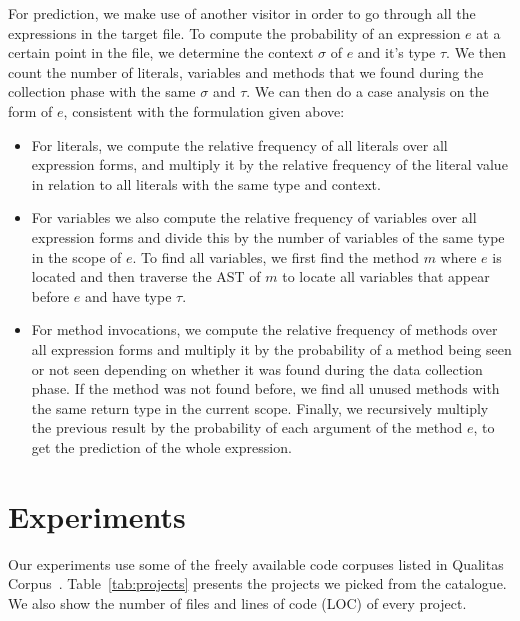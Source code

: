 \documentclass{article} %
\begin{document}
For prediction, we make use of another visitor in order to go through all the expressions in the target file. To compute the probability of an expression $e$ at a certain point in the file, we determine the context $\sigma$ of $e$ and it's type $\tau$. We
then count the number of literals, variables and methods that we found during the collection phase with the same $\sigma$ and $\tau$. We can then do a case analysis on the form of $e$, consistent with the formulation given above:

\begin{itemize}
   \item For literals, we compute the relative frequency of all literals over all expression forms, and multiply it by the relative frequency of the literal value in relation to all literals with the same type and context.
   \item For variables we also compute the relative frequency of variables over all expression forms and divide this by the number of variables of the same type in the scope of $e$. To find all variables, we first find the method $m$ where $e$ is located and then traverse the AST of $m$ to locate all variables that appear before $e$ and have type $\tau$.
   \item For method invocations, we compute the relative frequency of methods over all expression forms and multiply it by the probability of a method being seen or not seen depending  on whether it was found during the data collection phase. If the method was not found before, we find all unused methods with the same return type in the current scope. Finally, we recursively multiply the previous result by the probability of each argument of the method $e$, to get the prediction of the whole expression.
\end{itemize}

\section*{Experiments}


Our experiments use some of the freely available code corpuses listed in Qualitas Corpus~\cite{QualitasCorpus:APSEC:2010}.
Table~\ref{tab:projects} presents the projects we picked from the catalogue. We also show the number of files and
lines of code (LOC) of every project.
\end{document}
